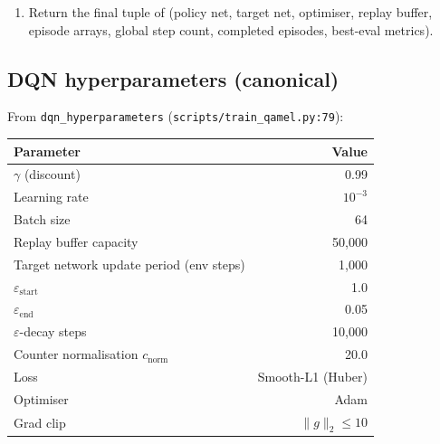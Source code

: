 \documentclass[11pt]{article}
\newcommand{\code}[1]{\texttt{#1}}
\newcommand{\file}[1]{\texttt{\small #1}}
\begin{document}
\begin{enumerate}
\begin{enumerate}
\begin{itemize}
          \item If buffer is large enough, sample a batch, build the Bellman target, mask next-state invalid actions \emph{too} (\code{\_build\_valid\_action\_mask}, \file{scripts/train\_qamel.py}), compute Smooth-L1 (Huber) loss, optimise with gradient clipping at $\|g\| \le 10$. If \code{--double-dqn} is enabled, the policy net selects the next action and the target net evaluates it.
          \item Periodically refresh the target network from the policy network.
        \end{itemize}
      \item At end of episode: record return, steps, success flag, mean per-step loss, mean swap-readiness.
      \item Optionally save a checkpoint at \code{--checkpoint\_every}, emit a metrics row at \code{--log\_every}.
      \item Optionally run an offline ``best-eval'' rollout (\S\ref{sec:besteval}) and update the best-eval checkpoint if the snapshot beats the running best on $(\text{success rate}, \text{mean return}, \text{lower mean steps})$ lex order.
    \end{enumerate}
  \item Return the final tuple of (policy net, target net, optimiser, replay buffer, episode arrays, global step count, completed episodes, best-eval metrics).
\end{enumerate}

\subsection{DQN hyperparameters (canonical)}
From \code{dqn\_hyperparameters} (\file{scripts/train\_qamel.py:79}):
\begin{center}
\begin{tabular}{lr}
\toprule
Parameter & Value \\
\midrule
$\gamma$ (discount) & 0.99 \\
Learning rate & $10^{-3}$ \\
Batch size & 64 \\
Replay buffer capacity & 50{,}000 \\
Target network update period (env steps) & 1{,}000 \\
$\varepsilon_{\text{start}}$ & 1.0 \\
$\varepsilon_{\text{end}}$ & 0.05 \\
$\varepsilon$-decay steps & 10{,}000 \\
Counter normalisation $c_{\text{norm}}$ & 20.0 \\
Loss & Smooth-L1 (Huber) \\
Optimiser & Adam \\
Grad clip & $\|g\|_2 \le 10$ \\
\bottomrule
\end{tabular}
\end{center}
\end{document}
